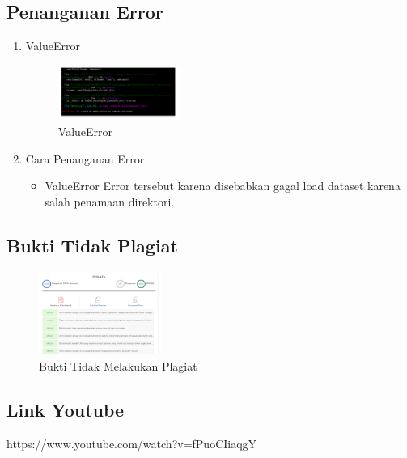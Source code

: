 \subsection{Penanganan Error}
\begin{enumerate}
	\item ValueError
	\begin{figure}[H]
		\includegraphics[width=4cm]{figures/1174071/8/error.PNG}
		\centering
		\caption{ValueError}
	\end{figure}

	\item Cara Penanganan Error
	\begin{itemize}
		\item ValueError
		\hfill\break
		Error tersebut karena disebabkan gagal load dataset karena salah penamaan direktori.
	\end{itemize}
\end{enumerate}

\subsection{Bukti Tidak Plagiat}
\begin{figure}[H]
\centering
	\includegraphics[width=4cm]{figures/1174071/8/bukti.PNG}
	\caption{Bukti Tidak Melakukan Plagiat}
\end{figure}
\subsection{Link Youtube}
https://www.youtube.com/watch?v=fPuoCIiaqgY